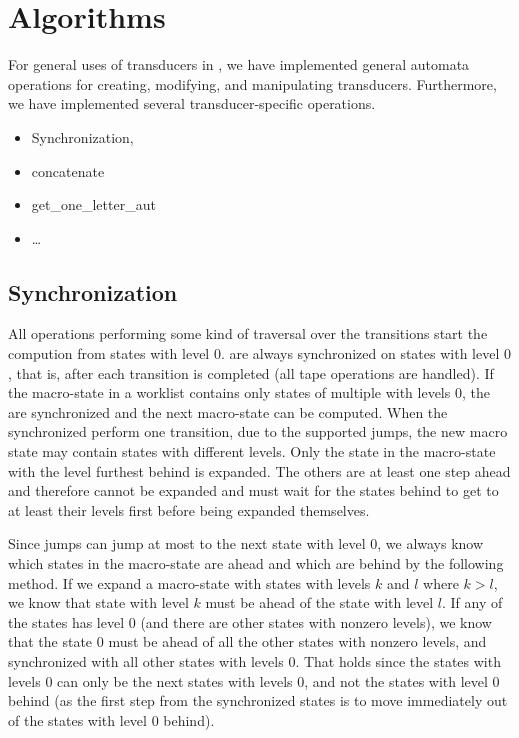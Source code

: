 \section{Algorithms}
\label{sec:Algorithms}

For general uses of transducers in \mata, we have implemented general automata operations for creating, modifying, and manipulating transducers.
Furthermore, we have implemented several transducer-specific operations.

\begin{itemize}
  \item Synchronization,
  \item concatenate
  \item get\_one\_letter\_aut
  \item \ldots
\end{itemize}

\subsection{Synchronization}

All operations performing some kind of traversal over the transitions start the compution from states with level $0$.
\nfts are always synchronized on states with level $0$, that is, after each \nft transition is completed (all tape operations are handled).
If the macro-state in a worklist contains only states of multiple \nfts with levels $0$, the \nfts are synchronized and the next macro-state can be computed.
When the synchronized \nfts perform one transition, due to the supported jumps, the new macro state may contain states with different levels.
Only the state in the macro-state with the level furthest behind is expanded.
The others are at least one step ahead and therefore cannot be expanded and must wait for the states behind to get to at least their levels first before being expanded themselves.

Since jumps can jump at most to the next state with level $0$, we always know which states in the macro-state are ahead and which are behind by the following method.
If we expand a macro-state with states with levels $k$ and $l$ where $k > l$, we know that state with level $k$ must be ahead of the state with level $l$.
If any of the states has level $0$ (and there are other states with nonzero levels), we know that the state $0$ must be ahead of all the other states with nonzero levels, and synchronized with all other states with levels $0$.
That holds since the states with levels $0$ can only be the next states with levels $0$, and not the states with level $0$ behind (as the first step from the synchronized states is to move immediately out of the states with level $0$ behind).

